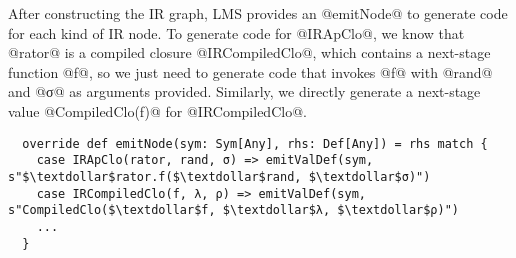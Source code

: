 After constructing the IR graph, LMS provides an @emitNode@ to generate code for
each kind of IR node. To generate code for @IRApClo@, we know that @rator@ is a
compiled closure @IRCompiledClo@, which contains a next-stage function @f@, so
we just need to generate code that invokes @f@ with @rand@ and @σ@ as arguments
provided. Similarly, we directly generate a next-stage value @CompiledClo(f)@
for @IRCompiledClo@.

\begin{lstlisting}
  override def emitNode(sym: Sym[Any], rhs: Def[Any]) = rhs match {
    case IRApClo(rator, rand, σ) => emitValDef(sym, s"$\textdollar$rator.f($\textdollar$rand, $\textdollar$σ)")
    case IRCompiledClo(f, λ, ρ) => emitValDef(sym, s"CompiledClo($\textdollar$f, $\textdollar$λ, $\textdollar$ρ)")
    ...
  }
\end{lstlisting}
